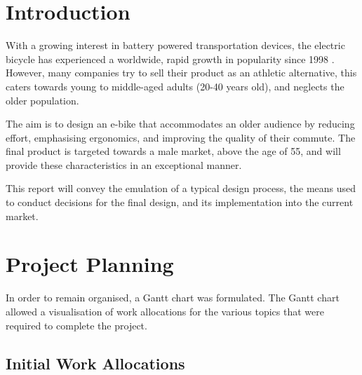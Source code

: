 \documentclass[a4paper,11pt]{article}
\begin{document}
\pagebreak

\tableofcontents

\pagebreak

\listoftables
{}

\pagebreak

\listoffigures
{}

\pagebreak


\section{Introduction}

With a growing interest in battery powered transportation devices, the electric bicycle has experienced a worldwide, rapid growth in popularity since 1998 \cite{wein07}. However, many companies try to sell their product as an athletic alternative, this caters towards young to middle-aged adults (20-40 years old), and neglects the older population. 

The aim is to design an e-bike that accommodates an older audience by reducing effort, emphasising ergonomics, and improving the quality of their commute. The final product is targeted towards a male market, above the age of 55, and will provide these characteristics in an exceptional manner.

This report will convey the emulation of a typical design process, the means used to conduct decisions for the final design, and its implementation into the current market.

\section{Project Planning}

In order to remain organised, a Gantt chart was formulated. The Gantt chart allowed a visualisation of work allocations for the various topics that were required to complete the project. 

\subsection{Initial Work Allocations}
\end{document}
